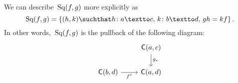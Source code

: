 \subsection{}

We can describe~$\operatorname{Sq}(f, g)$ more explicitly as
\[
	\Sq(f, g)
	=
	\{
		(h, k)
		\suchthat
		h \colon a \textto c, \,
		k \colon b \textto d, \,
		g h = k f
	\} \,.
\]
In other words,~$\operatorname{Sq}(f, g)$ is the pullback of the following diagram:
\[
	\begin{tikzcd}
		{}
		&
		\cat{C}(a, c)
		\arrow{d}[right]{g_*}
		\\
		\cat{C}(b, d)
		\arrow{r}[below]{f^*}
		&
		\cat{C}(a, d)
	\end{tikzcd}
\]
